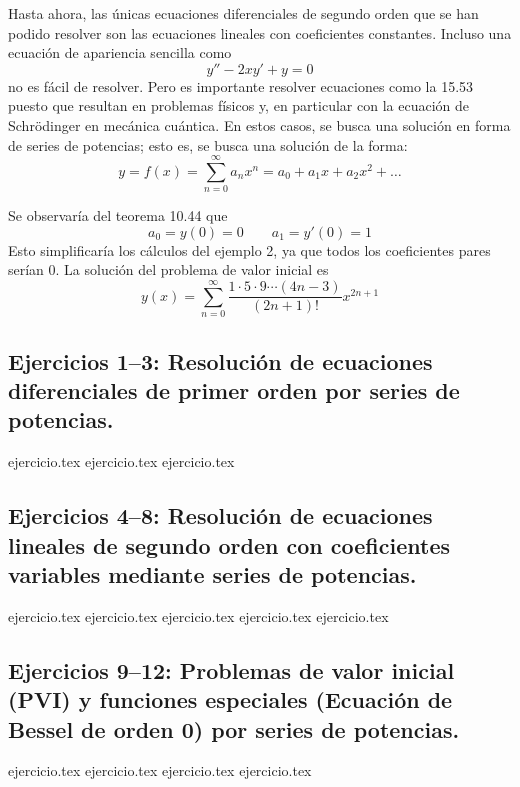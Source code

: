 
Hasta ahora, las únicas ecuaciones diferenciales de segundo orden que se han podido resolver son las ecuaciones lineales con coeficientes constantes. Incluso una ecuación de apariencia sencilla como
\begin{equation}
y'' - 2xy' + y = 0 \tag{15.53}
\end{equation}
no es fácil de resolver. Pero es importante resolver ecuaciones como la 15.53 puesto que resultan en problemas físicos y, en particular con la ecuación de Schrödinger en mecánica cuántica. En estos casos, se busca una solución en forma de series de potencias; esto es, se busca una solución de la forma:
\[ y = f(x) = \sum_{n=0}^\infty a_n x^n = a_0 + a_1x + a_2x^2 + \dots \]

Se observaría del teorema 10.44 que
\[ a_0 = y(0) = 0 \qquad a_1 = y'(0) = 1 \]
Esto simplificaría los cálculos del ejemplo 2, ya que todos los coeficientes pares serían 0. La solución del problema de valor inicial es
\[ y(x) = \sum_{n=0}^\infty \frac{1 \cdot 5 \cdot 9 \cdots (4n - 3)}{(2n + 1)!} x^{2n+1} \]

\subsection*{Ejercicios 1--3: Resolución de ecuaciones diferenciales de primer orden por series de potencias.}
\begin{enumerate}
    {ejercicio.tex}
    {ejercicio.tex}
    {ejercicio.tex}
\end{enumerate}

\subsection*{Ejercicios 4--8: Resolución de ecuaciones lineales de segundo orden con coeficientes variables mediante series de potencias.}
\begin{enumerate}
    \setcounter{enumi}{3}
    {ejercicio.tex}
    {ejercicio.tex}
    {ejercicio.tex}
    {ejercicio.tex}
    {ejercicio.tex}
\end{enumerate}

\subsection*{Ejercicios 9--12: Problemas de valor inicial (PVI) y funciones especiales (Ecuación de Bessel de orden 0) por series de potencias.}
\begin{enumerate}
    \setcounter{enumi}{8}
    {ejercicio.tex}
    {ejercicio.tex}
    {ejercicio.tex}
    {ejercicio.tex}
\end{enumerate}
